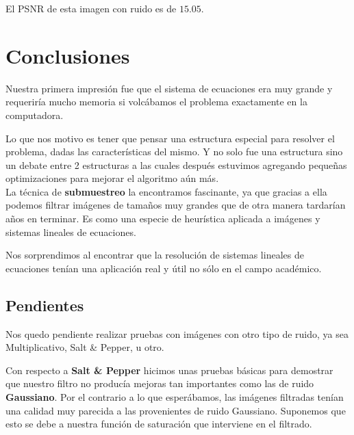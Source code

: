 \documentclass[a4paper]{article}
\begin{document}
El PSNR de esta imagen con ruido es de $15.05$.


\newpage

\section{Conclusiones}
Nuestra primera impresión fue que el sistema de ecuaciones era muy grande y requeriría mucho memoria si volcábamos el problema exactamente en la computadora.

Lo que nos motivo es tener que pensar una estructura especial para resolver el problema, dadas las características del mismo. Y no solo fue una estructura sino un debate entre 2 estructuras a las cuales después estuvimos agregando pequeñas optimizaciones para mejorar el algoritmo aún más. \\ 

La técnica de \textbf{submuestreo} la encontramos fascinante, ya que gracias a ella podemos filtrar imágenes de tamaños muy grandes que de otra manera tardarían años en terminar. Es como una especie de heurística aplicada a imágenes y sistemas lineales de ecuaciones.

Nos sorprendimos al encontrar que la resolución de sistemas lineales de ecuaciones tenían una aplicación real y útil no sólo en el campo académico. 

\subsection{Pendientes}
Nos quedo pendiente realizar pruebas con imágenes con otro tipo de ruido, ya sea Multiplicativo, Salt \& Pepper, u otro.

Con respecto a \textbf{Salt \& Pepper} hicimos unas pruebas básicas para demostrar que nuestro filtro no producía mejoras tan importantes como las de ruido \textbf{Gaussiano}. Por el contrario a lo que esperábamos, las imágenes filtradas tenían una calidad muy parecida a las provenientes de ruido Gaussiano. Suponemos que esto se debe a nuestra función de saturación que interviene en el filtrado.
\end{document}
